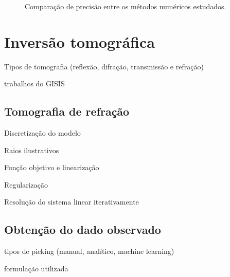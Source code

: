 \begin{figure}[H]
	\caption{Comparação de precisão entre os métodos numéricos estudados.}
	\label{fig:resultsNumericalComparison}
\end{figure}







\section{Inversão tomográfica}

Tipos de tomografia (reflexão, difração, transmissão e refração)

trabalhos do GISIS

\subsection*{Tomografia de refração}
Discretização do modelo

Raios ilustrativos

Função objetivo e linearização

Regularização 

Resolução do sistema linear iterativamente

\subsection*{Obtenção do dado observado}

tipos de picking (manual, analítico, machine learning)

formulação utilizada
 
 
